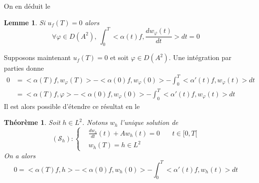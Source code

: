 \documentclass[a4paper]{book}
\newtheorem{thm}{Théorème}[chapter]
\newtheorem{lem}{Lemme}[chapter]
\begin{document}
On en déduit le
\begin{lem}
    Si $u_f(T)=0$ alors
    \[\forall \varphi \in D(A^2),\ \int_{0}^{T}<\alpha(t)f,\frac{dw_\varphi(t)}{dt}>dt=0 \]
\end{lem}

Supposons maintenant $u_f(T)=0$ et soit $\varphi\in D(A^2)$. Une intégration par parties donne
\[\begin{aligned}
        0 & =<\alpha(T)f,w_\varphi(T)> - <\alpha(0)f,w_\varphi(0)> - \int_{0}^{T}<\alpha'(t)f,w_\varphi(t)>dt \\
          & =<\alpha(T)f,\varphi> - <\alpha(0)f,w_\varphi(0)> - \int_{0}^{T}<\alpha'(t)f,w_\varphi(t)>dt
    \end{aligned} \]
Il est alors possible d'étendre ce résultat en le
\begin{thm}\label{thm1}
    Soit $h\in L^2$. Notons $w_h$ l'unique solution de
    \[(\mathcal{S}_h):\left\lbrace\begin{aligned}
             & \frac{dw_h}{dt}(t)+A w_h(t)=0 & \  & t\in[0,T[ \\
             & w_h(T)=h\in L^2
        \end{aligned}\right. \]
    On a alors
    \[0=<\alpha(T)f,h> - <\alpha(0)f,w_h(0)> - \int_{0}^{T}<\alpha'(t)f,w_h(t)>dt\]
\end{thm}
\end{document}
